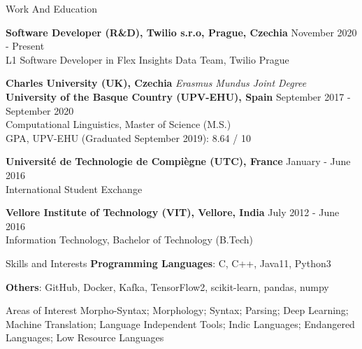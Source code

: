 \documentclass{resume} %
\begin{document}


    
\begin{rSection}{Work And Education}

    {\bf Software Developer (R\&D), Twilio s.r.o, Prague, Czechia} \hfill
        {November 2020 - Present}\\
            L1 Software Developer in Flex Insights Data Team, Twilio Prague
    
    {\bf Charles University (UK), Czechia} \hfill
        {\em Erasmus Mundus Joint Degree}\\
    {\bf University of the Basque Country (UPV-EHU), Spain} \hfill
        {September 2017 - September 2020}\\
            Computational Linguistics, Master of Science (M.S.)\\
            GPA, UPV-EHU (Graduated September 2019): 8.64 / 10%
    
    {\bf Universit\'e de Technologie de Compi\`egne (UTC), France} \hfill
        {January - June 2016}\\
            International Student Exchange
    
    {\bf Vellore Institute of Technology (VIT), Vellore, India} \hfill
        {July 2012 - June 2016}\\
            Information Technology, Bachelor of Technology (B.Tech)

\end{rSection}


\begin{rSection}{Skills and Interests}
    {\textbf{Programming Languages}: C, C++, Java11, Python3}
    
    {\textbf{Others}: GitHub, Docker, Kafka, TensorFlow2, scikit-learn, pandas, numpy}
    
    \begin{rSubsection}{Areas of Interest}{}{}{}
        Morpho-Syntax; Morphology; Syntax; Parsing; Deep Learning; Machine Translation; 
        Language Independent Tools; Indic Languages; Endangered Languages; Low Resource 
        Languages
    \end{rSubsection}
\end{rSection}
\end{document}
